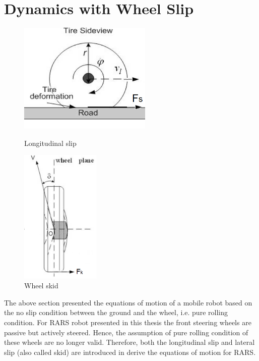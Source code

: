 \section{Dynamics with Wheel Slip}
\begin{figure}
		\begin{minipage}[t]{0.5\textwidth}
		\centering
		\includegraphics[width=2.5in]{Chapter3/fig/Slip} 
		\caption{Longitudinal slip \cite{wang2008modeling}}\label{fig:slip}
	\end{minipage}
	\hfill
	\begin{minipage}[t]{0.5\textwidth}
		\centering
		\includegraphics[width=1.5in]{Chapter3/fig/Skid} 
		\caption{Wheel skid \cite{wang2008modeling}}\label{fig:skid}
	\end{minipage}
\end{figure}
The above section presented  the equations of motion  of a mobile robot  based on the no slip condition between the ground and the wheel, i.e. pure rolling condition. For RARS robot presented in this thesis the front steering wheels  are passive  but actively steered. Hence, the assumption of pure rolling condition of these wheels are no longer valid. Therefore, both the longitudinal slip and lateral slip (also called skid) are introduced in derive the equations of motion for RARS.
